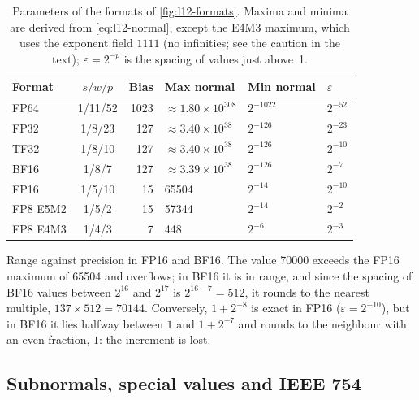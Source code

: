 \documentclass[../main.tex]{subfiles}
\begin{document}
\begin{table}[htbp]
  \centering
  \caption{Parameters of the formats of \cref{fig:l12-formats}.  Maxima
    and minima are derived from \cref{eq:l12-normal}, except the E4M3
    maximum, which uses the exponent field $1111$ (no infinities; see
    the caution in the text); $\varepsilon =
    2^{-p}$ is the spacing of values just above~1.}
  \label{tab:l12-formats}
  \setlength{\tabcolsep}{4pt}
  \begin{tabular}{lcrlll}
    \toprule
    Format & $s/w/p$ & Bias & Max normal & Min normal & $\varepsilon$ \\
    \midrule
    FP64 & 1/11/52 & 1023 & $\approx 1.80 \times 10^{308}$ & $2^{-1022}$ & $2^{-52}$ \\
    FP32 & 1/8/23 & 127 & $\approx 3.40 \times 10^{38}$ & $2^{-126}$ & $2^{-23}$ \\
    TF32 & 1/8/10 & 127 & $\approx 3.40 \times 10^{38}$ & $2^{-126}$ & $2^{-10}$ \\
    BF16 & 1/8/7 & 127 & $\approx 3.39 \times 10^{38}$ & $2^{-126}$ & $2^{-7}$ \\
    \addlinespace
    FP16 & 1/5/10 & 15 & \num{65504} & $2^{-14}$ & $2^{-10}$ \\
    FP8 E5M2 & 1/5/2 & 15 & \num{57344} & $2^{-14}$ & $2^{-2}$ \\
    FP8 E4M3 & 1/4/3 & 7 & 448 & $2^{-6}$ & $2^{-3}$ \\
    \bottomrule
  \end{tabular}
\end{table}



\begin{example}
  \label{ex:l12-bf16}
  Range against precision in FP16 and BF16.  The value \num{70000}
  exceeds the FP16 maximum of \num{65504} and overflows; in BF16 it is
  in range, and since the spacing of BF16 values between $2^{16}$ and
  $2^{17}$ is $2^{16-7} = 512$, it rounds to the nearest multiple,
  $137 \times 512 = \num{70144}$.  Conversely, $1 + 2^{-8}$ is exact in
  FP16 ($\varepsilon = 2^{-10}$), but in BF16 it lies halfway between
  $1$ and $1 + 2^{-7}$ and rounds to the neighbour with an even
  fraction, $1$: the increment is lost.
\end{example}

\subsection{Subnormals, special values and IEEE 754}
\end{document}
